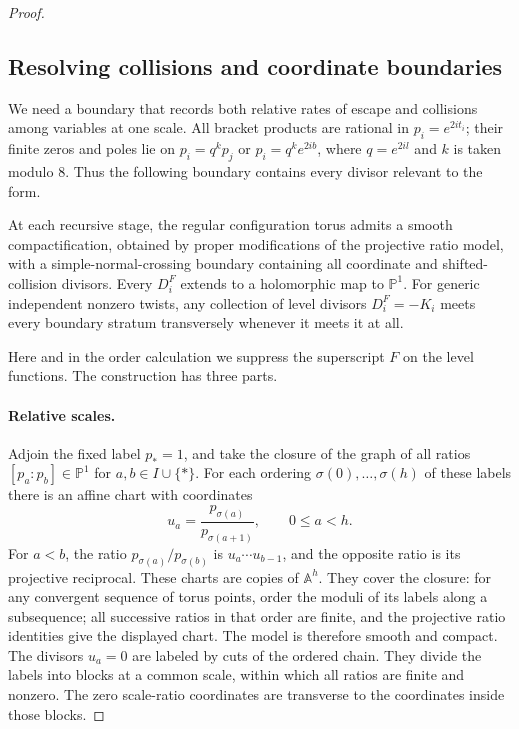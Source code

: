 \begin{proof}
\subsection{Resolving collisions and coordinate boundaries}

We need a boundary that records both relative rates of escape and collisions
among variables at one scale. All bracket products are rational in
$p_i=e^{2it_i}$; their finite zeros and poles lie on
$p_i=q^k p_j$ or $p_i=q^k e^{2ib}$, where $q=e^{2il}$ and $k$ is taken
modulo $8$. Thus the following boundary contains every divisor relevant to
the form.

\begin{claim}\label{cl:compactification}
At each recursive stage, the regular configuration torus admits a smooth compactification, obtained by proper modifications of the projective ratio model, with a simple-normal-crossing boundary containing all coordinate and shifted-collision divisors. Every $D_i^F$ extends to a holomorphic map to $\mathbb P^1$. For generic independent nonzero twists, any collection of level divisors $D_i^F=-K_i$ meets every boundary stratum transversely whenever it meets it at all.
\end{claim}

Here and in the order calculation we suppress the superscript $F$ on the
level functions. The construction has three parts.

\paragraph{Relative scales.}
Adjoin the fixed label $p_*=1$, and take the closure of the graph of all
ratios $[p_a:p_b]\in\mathbb P^1$ for $a,b\in I\cup\{*\}$. For each ordering
$\sigma(0),\ldots,\sigma(h)$ of these labels there is an affine chart with
coordinates
\[
 u_a=\frac{p_{\sigma(a)}}{p_{\sigma(a+1)}},\qquad 0\le a<h.
\]
For $a<b$, the ratio $p_{\sigma(a)}/p_{\sigma(b)}$ is
$u_a\cdots u_{b-1}$, and the opposite ratio is its projective reciprocal.
These charts are copies of $\mathbb A^h$. They cover the closure: for any
convergent sequence of torus points, order the moduli of its labels along a
subsequence; all successive ratios in that order are finite, and the
projective ratio identities give the displayed chart. The model is therefore
smooth and compact. The divisors $u_a=0$ are labeled by cuts of the ordered
chain. They divide the labels into blocks at a common scale, within which
all ratios are finite and nonzero. The zero scale-ratio coordinates are
transverse to the coordinates inside those blocks.


\end{proof}
